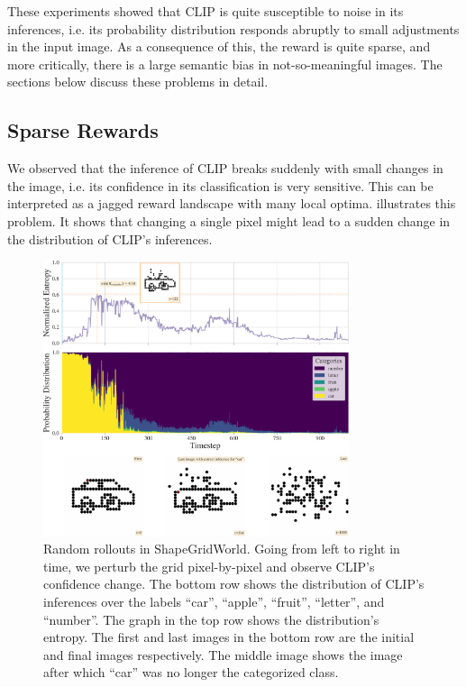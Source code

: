 These experiments showed that CLIP is quite susceptible to noise in its inferences, i.e. its probability distribution responds abruptly to small adjustments in the input image.
As a consequence of this, the reward is quite sparse, and more critically, there is a large semantic bias in not-so-meaningful images.
The sections below discuss these problems in detail.

\subsection{Sparse Rewards} %
\label{sec:sparse-rewards}

We observed that the inference of CLIP breaks suddenly with small changes in the image, i.e. its confidence in its classification is very sensitive.
This can be interpreted as a jagged reward landscape with many local optima.
 illustrates this problem.
It shows that changing a single pixel might lead to a sudden change in the distribution of CLIP's inferences.

\begin{figure}[h]
    \centering
    \includegraphics[width=0.8\textwidth]{images/sparse_rewards.pdf}
    \caption[Random rollouts in ShapeGridWorld.]{Random rollouts in ShapeGridWorld. Going from left to right in time, we perturb the grid pixel-by-pixel and observe CLIP's confidence change. The bottom row shows the distribution of CLIP's inferences over the labels ``car'', ``apple'', ``fruit'', ``letter'', and ``number''. The graph in the top row shows the distribution's entropy. The first and last images in the bottom row are the initial and final images respectively.
    The middle image shows the image after which ``car'' was no longer the categorized class.}
    \label{fig:sparse-rewards}
    
\end{figure}

